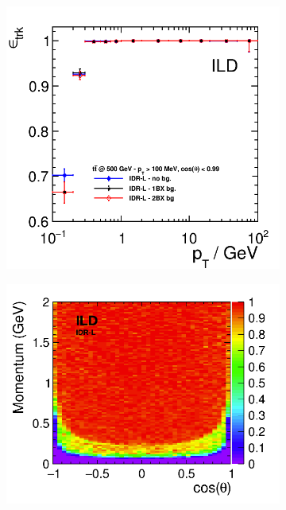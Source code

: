 \begin{figure}[htbp]
\begin{subfigure}{0.49\hsize}
 \caption{ \label{fig:perf:trkeff_th}}
 \end{subfigure}
\begin{subfigure}{0.49\hsize} 
 \includegraphics[width=\hsize]{Performance/fig/trkEff_pt_ttbar_pairBG_IDR.png}
 \caption{  \label{fig:perf:trkeff_bg}}
 \end{subfigure}
\begin{subfigure}{0.49\hsize} 
 \includegraphics[width=\hsize]{Performance/fig/newSiliconTracking_10kEvents_effTrk_Momentum_v3.png}

\end{subfigure}
\end{figure}
